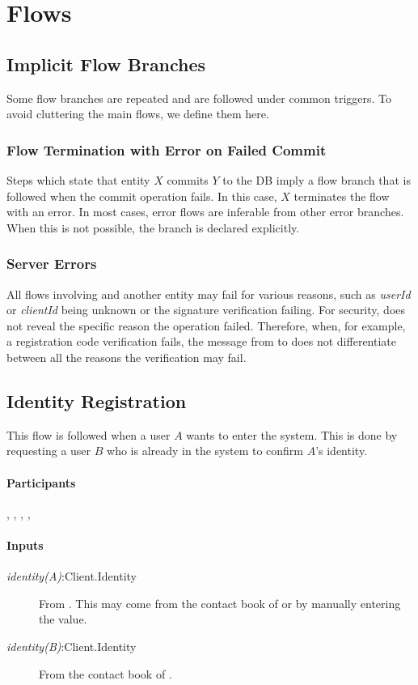 \documentclass[a4paper,10pt]{article}
\newcommand{\userId}{\emph{userId}}
\newcommand{\clientId}{\emph{clientId}}
\newcommand{\identity}[1]{{\em identity(#1)}}
\begin{document}
\section{Flows}

\subsection{Implicit Flow Branches}
Some flow branches are repeated and are followed under common triggers. To avoid cluttering the main flows, we define them here.

\subsubsection{Flow Termination with Error on Failed Commit}
Steps which state that entity $X$ commits $Y$ to the DB imply a flow branch that is followed when the commit operation fails. In this case, $X$ terminates the flow with an error. 
In most cases, error flows are inferable from other error branches. When this is not possible, the branch is declared explicitly. 

\subsubsection{Server Errors}
All flows involving \Server{} and another entity may fail for various reasons, such as \userId{} or \clientId{} being unknown or the signature verification failing. For security, 
\Server{} does not reveal the specific reason the operation failed. Therefore, when, for example, a registration code verification fails, the message from \Server{} to \Client{} 
does not differentiate between all the reasons the verification may fail.

\subsection{Identity Registration}
\label{identity_registration_flow}
This flow is followed when a user $A$ wants to enter the system. This is done by requesting a user $B$ who is already in the system to confirm $A$'s identity.

\paragraph{Participants} \User[A], \User[B], \Client[A], \Client[B], \Server{}

\paragraph{Inputs}
\SpecialItem
\begin{description}
 \item[\identity{A}:Client.Identity] From \Client[A]. This may come from the contact book of \User[A] or by \User[A] manually entering the value.
 \item[\identity{B}:Client.Identity] From the contact book of \User[A].
\end{description}
\end{document}

